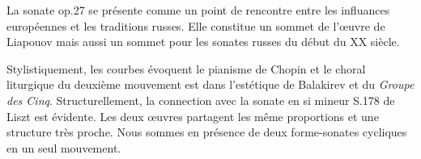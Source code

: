 La sonate op.27 se présente comme un point de rencontre entre les influances européennes et les traditions russes. Elle constitue un sommet de l'œuvre de Liapouov mais aussi un sommet pour les sonates russes du début du XX\ieme{} siècle.

Stylistiquement, les courbes évoquent le pianisme de Chopin et le choral liturgique du deuxième mouvement est dans l'estétique de Balakirev et du \emph{Groupe des Cinq}. Structurellement, la connection avec la sonate en si mineur S.178 de Liszt est évidente. Les deux œuvres partagent les même proportions et une structure très proche. Nous sommes en présence de deux forme-sonates cycliques en un seul mouvement.


